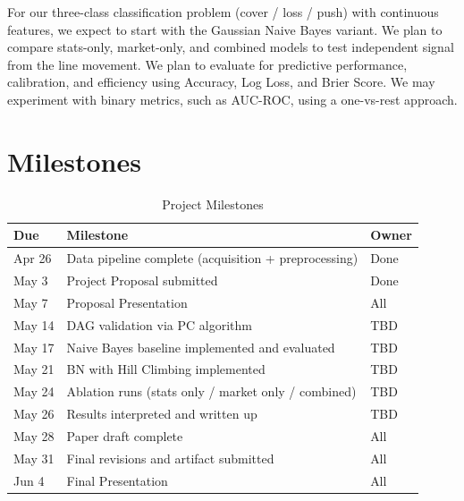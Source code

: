 \documentclass[letterpaper]{article}
\begin{document}
For our three-class classification problem (cover / loss / push) with continuous features, we expect to start with the Gaussian Naive Bayes variant. We plan to compare stats-only, market-only, and combined models to test independent signal from the line movement. We plan to evaluate for predictive performance, calibration, and efficiency using Accuracy, Log Loss, and Brier Score. We may experiment with binary metrics, such as AUC-ROC, using a one-vs-rest approach.

\section{Milestones}

\begin{table}[h]
	\centering
	\small
	\caption{Project Milestones}
\begin{tabular}{l p{8cm} l}
		\hline
		\textbf{Due} & \textbf{Milestone} & \textbf{Owner} \\
		\hline
		Apr 26 & Data pipeline complete (acquisition + preprocessing)      & Done \\
		May 3  & Project Proposal submitted                          & Done \\
		May 7  & Proposal Presentation                               & All \\
		May 14 & DAG validation via PC algorithm                     & TBD \\
		May 17 & Naive Bayes baseline implemented and evaluated      & TBD \\
		May 21 & BN with Hill Climbing implemented                   & TBD \\
		May 24 & Ablation runs (stats only / market only / combined) & TBD \\
		May 26 & Results interpreted and written up                  & TBD \\
		May 28 & Paper draft complete                                & All \\
		May 31 & Final revisions and artifact submitted              & All \\
		Jun 4  & Final Presentation                                  & All \\
		\hline
	\end{tabular}
	\label{tab:milestones}
\end{table}
\end{document}
